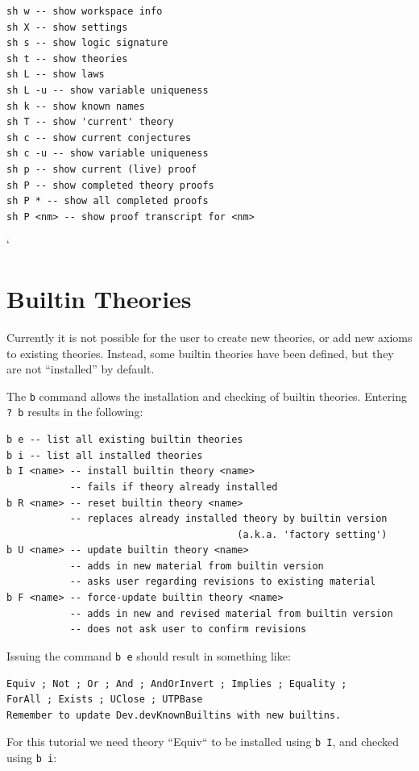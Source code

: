 \documentclass[11pt]{article}
\begin{document}
\begin{verbatim}
sh w -- show workspace info
sh X -- show settings
sh s -- show logic signature
sh t -- show theories
sh L -- show laws
sh L -u -- show variable uniqueness
sh k -- show known names
sh T -- show 'current' theory
sh c -- show current conjectures
sh c -u -- show variable uniqueness
sh p -- show current (live) proof
sh P -- show completed theory proofs
sh P * -- show all completed proofs
sh P <nm> -- show proof transcript for <nm>
\end{verbatim}`

\newpage
\section{Builtin Theories}

Currently it is not possible for the user to create new theories,
or add new axioms to existing theories.
Instead, some builtin theories have been defined, 
but they are not ``installed'' by default.

The \verb"b" command allows the installation and checking of builtin theories. Entering \verb"? b" results in the following:

\begin{verbatim}
b e -- list all existing builtin theories
b i -- list all installed theories
b I <name> -- install builtin theory <name>
           -- fails if theory already installed
b R <name> -- reset builtin theory <name>
           -- replaces already installed theory by builtin version
                                        (a.k.a. 'factory setting')
b U <name> -- update builtin theory <name>
           -- adds in new material from builtin version
           -- asks user regarding revisions to existing material
b F <name> -- force-update builtin theory <name>
           -- adds in new and revised material from builtin version
           -- does not ask user to confirm revisions
\end{verbatim}

Issuing the command \verb"b e" should result in something like:

\begin{verbatim}
Equiv ; Not ; Or ; And ; AndOrInvert ; Implies ; Equality ; 
ForAll ; Exists ; UClose ; UTPBase
Remember to update Dev.devKnownBuiltins with new builtins.
\end{verbatim}

For this tutorial we need theory ``Equiv`` to be installed using \verb"b I",
and checked using \verb"b i":
\end{document}
